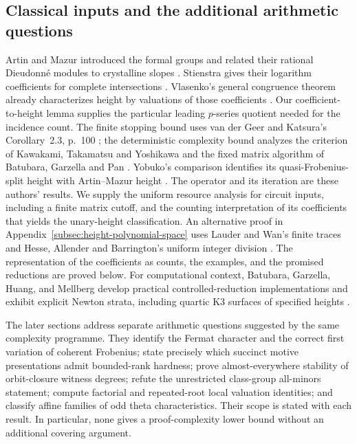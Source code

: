 \documentclass[11pt]{article}
\theoremstyle{definition}
\begin{document}
\subsection{Classical inputs and the additional arithmetic questions}
Artin and Mazur introduced the formal groups and related their rational
Dieudonn\'e modules to crystalline slopes
\citep[II, Corollaries~4.2--4.3, pp.~109--110; III, Corollaries~3.3--3.4,
pp.~118--119]{AM}. Stienstra gives their logarithm coefficients for
complete intersections \citep[Theorem~1, pp.~907--908]{Stienstra}.
Vlasenko's general congruence theorem already characterizes height
by valuations of those coefficients
\citep[Theorem~2(i), arXiv version~5, p.~3]{Vlasenko2019}.
Our coefficient-to-height lemma supplies the particular leading
$p$-series quotient needed for the incidence count.
The finite stopping bound uses van der Geer and Katsura's
Corollary~2.3, p.~100 \citep{vdGK2003}; the deterministic complexity
bound analyzes the criterion of Kawakami, Takamatsu and Yoshikawa
\citep[Theorem~C, version~3, p.~4; already in version~2, p.~5]{KTY2025}
and the fixed matrix algorithm of Batubara, Garzella and Pan
\citep[Section~3.4 and Algorithm~4, p.~7]{BGP2025}.
Yobuko's comparison identifies its quasi-Frobenius-split height with
Artin--Mazur height \citep[Theorem~4.5, author version pp.~9--10]{Yobuko2019}.
The operator and its iteration are these authors' results. We supply
the uniform resource analysis for circuit inputs, including a finite
matrix cutoff, and the counting interpretation of its coefficients
that yields the unary-height classification. An alternative proof in Appendix~\ref{subsec:height-polynomial-space}
uses Lauder and Wan's finite traces and Hesse, Allender and Barrington's
uniform integer division
\citep[Theorem~28, pp.~600--601]{LauderWan2008}
\citep[Corollary~6.3, author manuscript p.~16]{HAB2002}.
The representation of the coefficients as counts, the examples,
and the promised reductions are proved below.
For computational context, Batubara, Garzella, Huang, and Mellberg
develop practical controlled-reduction implementations and exhibit
explicit Newton strata, including quartic K3 surfaces of specified heights
\citep[Section~1.5, pp.~4--5; Theorem~1.4, p.~5]{BGHM2026}.

The later sections address separate arithmetic questions suggested
by the same complexity programme. They identify the Fermat character
and the correct first variation of coherent Frobenius; state precisely
which succinct motive presentations admit bounded-rank hardness;
prove almost-everywhere stability of orbit-closure witness degrees;
refute the unrestricted class-group all-minors statement;
compute factorial and repeated-root local valuation identities;
and classify affine families of odd theta characteristics.
Their scope is stated with each result. In particular, none gives a
proof-complexity lower bound without an additional covering argument.
\end{document}
